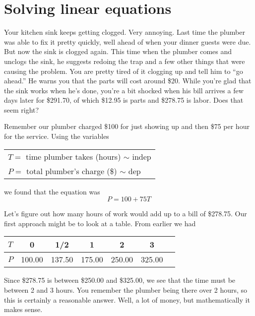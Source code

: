
\section{Solving linear equations }

Your kitchen sink keeps getting clogged.  Very annoying. Last time %
the plumber was able to fix it pretty quickly, well ahead of when your dinner guests were due.  But now the sink is clogged again.  This time when the plumber comes and unclogs the sink, he suggests redoing the trap and a few other things that were causing the problem.  You are pretty tired of it clogging up and tell him to ``go ahead.''  He warns you that the parts will cost around \$20.  While you're glad that the sink works when he's done, you're a bit shocked when his bill arrives a few days later for \$291.70, of which \$12.95 is parts and \$278.75 is labor. Does that seem right?

Remember our plumber charged \$100 for just showing up and then \$75 per hour for the service.  Using the variables  
\begin{center}
\begin{tabular} {l} 
$T=$ time plumber takes (hours) $\sim$ indep \\
$P= $ total plumber's charge (\$) $\sim$ dep \\ 
\end{tabular}
\end{center}
we found that the equation was $$P=100+75T$$  

Let's figure out how many hours of work would add up to a bill of \$278.75.  Our first approach might be to look at a table.  From earlier we had

\begin{center}
\begin{tabular} {|l| |c |c |c |c |c |c  |} \hline
$T$ & 0 & 1/2 & 1 & 2 & 3 \\ \hline
$P$ & 100.00 & 137.50 & 175.00 & 250.00 & 325.00 \\ \hline
\end{tabular}
\end{center}

\noindent Since \$278.75 is between \$250.00 and \$325.00, we see that the time must be between 2 and 3 hours. You remember the plumber being there over 2 hours, so this is certainly a reasonable answer.  Well, a lot of money, but mathematically it makes sense.

